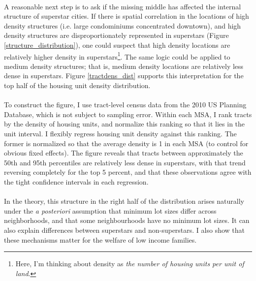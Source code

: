 \documentclass[]{article}
\theoremstyle{plain}
\begin{document}
\paragraph*{}
A reasonable next step is to ask if the missing middle has affected the internal structure of superstar cities. If there is spatial correlation in the locations of high density structures (i.e. large condominiums concentrated downtown), and high density structures are disproportionately represented in superstars (Figure \ref{structure_distribution}), one could suspect that high density locations are relatively higher density in superstars\footnote{Here, I'm thinking about density as \textit{the number of housing units per unit of land}.}. The same logic could be applied to medium density structures; that is, medium density locations are relatively less dense in superstars. Figure \ref{tractdens_dist} supports this interpretation for the top half of the housing unit density distribution.
\paragraph*{}
To construct the figure, I use tract-level census data from the 2010 US Planning Database, which is not subject to sampling error. Within each MSA, I rank tracts by the density of housing units, and normalize this ranking so that it lies in the unit interval. I flexibly regress housing unit density against this ranking. The former is normalized so that the average density is 1 in each MSA (to control for obvious fixed effects). The figure reveals that tracts between approximately the 50th and 95th percentiles are relatively less dense in superstars, with that trend reversing completely for the top 5 percent, and that these observations agree with the tight confidence intervals in each regression.\paragraph*{}

In the theory, this structure in the right half of the distribution arises naturally under the \textit{a posteriori} assumption that minimum lot sizes differ across neighborhoods, and that some neighbourhoods have no minimum lot sizes. It can also explain differences between superstars and non-superstars. I also show that these mechanisms matter for the welfare of low income families. 
\end{document}
